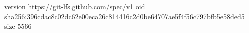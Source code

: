 version https://git-lfs.github.com/spec/v1
oid sha256:396cdac8c02dc62e00eca26c814416c2d0be64707ae5f4f56c797bfb5e58ded5
size 5566
